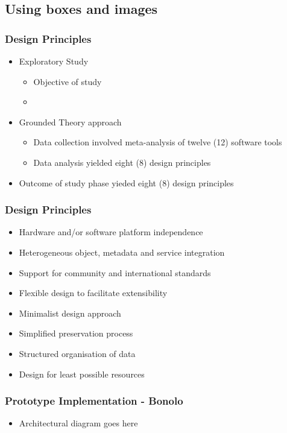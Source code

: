 \documentclass[xcolor=pdftex,t,11pt]{beamer}
\begin{document}
\subsection{Using boxes and images}

\begin{frame}[fragile]
\frametitle{Design Principles}
\begin{itemize}
\item Exploratory Study
\begin{itemize}
\item Objective of study
\item 
\end{itemize}
\item Grounded Theory approach
\begin{itemize}
\item Data collection involved meta-analysis of twelve (12) software tools
\item Data analysis yielded eight (8) design principles
\end{itemize}
\item Outcome of study phase yieded eight (8) design principles
\end{itemize}
\end{frame}

\begin{frame}[fragile]
\frametitle{Design Principles}
\begin{itemize}
\item Hardware and/or software platform independence
\item Heterogeneous object, metadata and service integration
\item Support for community and international standards
\item Flexible design to facilitate extensibility
\item Minimalist design approach
\item Simplified preservation process
\item Structured organisation of data
\item Design for least possible resources
\end{itemize}

\end{frame}


\begin{frame}[fragile]
\frametitle{Prototype Implementation - Bonolo}
\begin{itemize}
\item Architectural diagram goes here
\end{itemize}
\begin{figure}
\end{figure}
\end{frame}
\end{document}
